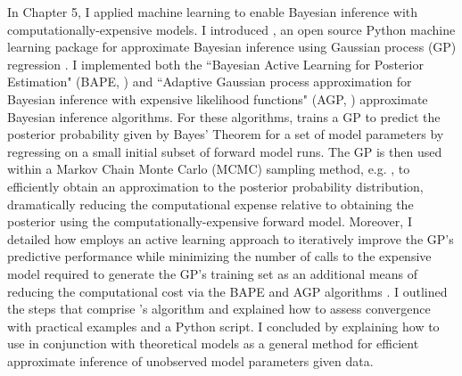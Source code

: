 In Chapter 5, I applied machine learning to enable Bayesian inference with computationally-expensive models. I introduced \approxposterior, an open source Python machine learning package for approximate Bayesian inference using Gaussian process (GP) regression \citep{FlemingVanderPlas2018}. I implemented both the ``Bayesian Active Learning for Posterior Estimation" (BAPE, \citet{Kandasamy2017}) and ``Adaptive Gaussian process approximation for Bayesian inference with expensive likelihood functions" (AGP, \citet{Wang2018}) approximate Bayesian inference algorithms. For these algorithms, \approxposterior trains a GP to predict the posterior probability given by Bayes' Theorem for a set of model parameters by regressing on a small initial subset of forward model runs. The GP is then used within a Markov Chain Monte Carlo (MCMC) sampling method, e.g. \emcee \citep{ForemanMackey2013}, to efficiently obtain an approximation to the posterior probability distribution, dramatically reducing the computational expense relative to obtaining the posterior using the computationally-expensive forward model. Moreover, I detailed how \approxposterior employs an active learning approach to iteratively improve the GP's predictive performance while minimizing the number of calls to the expensive model required to generate the GP's training set as an additional means of reducing the computational cost via the BAPE and AGP algorithms \citep{Kandasamy2017,Wang2018}.  I outlined the steps that comprise \approxposterior's algorithm and explained how to assess convergence with practical examples and a Python script. I concluded by explaining how to use \approxposterior in conjunction with theoretical models as a general method for efficient approximate inference of unobserved model parameters given data.
 
